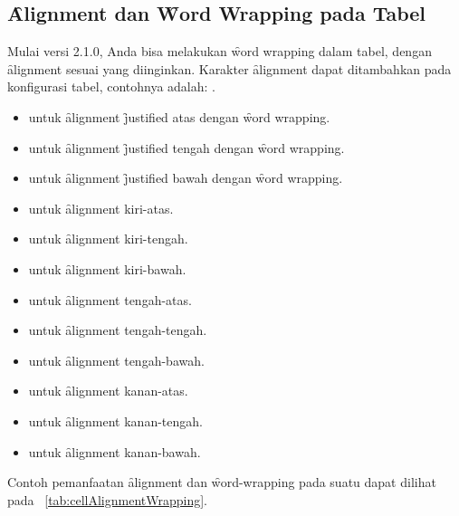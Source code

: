 \subsection{\f{Alignment} dan \f{Word Wrapping} pada Tabel}
\label{sec:cellAlignmentAndWordWrap}
Mulai versi 2.1.0, Anda bisa melakukan \f{word wrapping} dalam tabel, dengan \f{alignment} sesuai yang diinginkan.
Karakter \f{alignment} dapat ditambahkan pada konfigurasi tabel, contohnya adalah: .

\begin{itemize}
	\item {} untuk \f{alignment} \f{justified} atas dengan \f{word wrapping}.
	\item {} untuk \f{alignment} \f{justified} tengah dengan \f{word wrapping}.
	\item {} untuk \f{alignment} \f{justified} bawah dengan \f{word wrapping}.
	\item {} untuk \f{alignment} kiri-atas.
	\item {} untuk \f{alignment} kiri-tengah.
	\item {} untuk \f{alignment} kiri-bawah.
	\item {} untuk \f{alignment} tengah-atas.
	\item {} untuk \f{alignment} tengah-tengah.
	\item {} untuk \f{alignment} tengah-bawah.
	\item {} untuk \f{alignment} kanan-atas.
	\item {} untuk \f{alignment} kanan-tengah.
	\item {} untuk \f{alignment} kanan-bawah.
\end{itemize}

Contoh pemanfaatan \f{alignment} dan \f{word-wrapping} pada suatu  dapat dilihat pada \tab~\ref{tab:cellAlignmentWrapping}.

